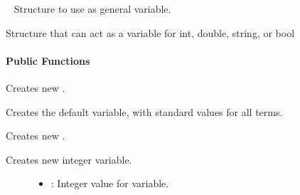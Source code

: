 \documentclass[letterpaper,10pt,english]{sphinxmanual}
\begin{document}
\begin{fulllineitems}
\label{\detokenize{index:_CPPv2N7ostendo3VarE}}%
\pysigstartmultiline
{}\label{\detokenize{index:Pessumstructostendo_1_1Var}}%
\pysigstopmultiline~
Structure to use as general variable. 

Structure that can act as a variable for int, double, string, or bool 
\paragraph{Public Functions}

\begin{fulllineitems}
\label{\detokenize{index:_CPPv2N7ostendo3Var3VarEv}}%
\pysigstartmultiline
{}\label{\detokenize{index:Pessumstructostendo_1_1Var_1addaf85e46b9bfd2d98b5bc8200b06c5b}}%
\pysigstopmultiline
Creates new {\hyperref[\detokenize{index:Pessumstructostendo_1_1Var}]{}}. 

Creates the default variable, with standard values for all terms. 

\end{fulllineitems}


\begin{fulllineitems}
\label{\detokenize{index:_CPPv2N7ostendo3Var3VarEi}}%
\pysigstartmultiline
{}\label{\detokenize{index:Pessumstructostendo_1_1Var_1a271aecf1954157dc34985a7a2ef506b9}}%
\pysigstopmultiline
Creates new {\hyperref[\detokenize{index:Pessumstructostendo_1_1Var}]{}}. 

Creates new integer variable. \begin{description}
\item[{}] \leavevmode\begin{itemize}
\item {} 
: Integer value for variable. 

\end{itemize}

\end{description}



\end{fulllineitems}
\end{fulllineitems}
\end{document}
